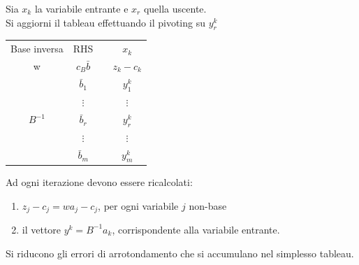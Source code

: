 Sia $x_{k}$ la variabile entrante e $x_{r}$ quella uscente.\\
Si aggiorni il tableau effettuando il pivoting su $y_{r}^{k}$
\begin{table}[h]
	\centering
	\def\arraystretch{1.3}
	\begin{tabular}{|c|c|c|c|}
		\multicolumn{1}{c}{Base inversa} & \multicolumn{1}{c}{RHS} & \multicolumn{1}{c}{} & \multicolumn{1}{c}{$x_{k}$} \\ \cline{1-2}\cline{4-4}
		w & $c_{B}\bar{b}$ &  & $z_{k}-c_{k}$ \\ \cline{1-2}\cline{4-4}
		& $\bar{b}_{1}$ &  & $y_{1}^{k}$ \\
		& $\vdots$ &  & $\vdots$ \\
		$B^{-1}$ & $\bar{b}_{r}$ &  & {\LARGE \textcircled{\normalsize $y_{r}^{k}$}} \\
		& $\vdots$ &  & $\vdots$ \\
		& $\bar{b}_{m}$ &  & $y_{m}^{k}$ \\ \cline{1-2}\cline{4-4}
	\end{tabular}
\end{table}
Ad ogni iterazione devono essere ricalcolati:
\begin{enumerate}
	\item $z_{j}-c_{j}=wa_{j}-c_{j}$, per ogni variabile $j$ non-base
	\item il vettore $y^{k}=B^{-1}a_{k}$, corrispondente alla variabile entrante.
\end{enumerate}
Si riducono gli errori di arrotondamento che si accumulano nel simplesso tableau.

